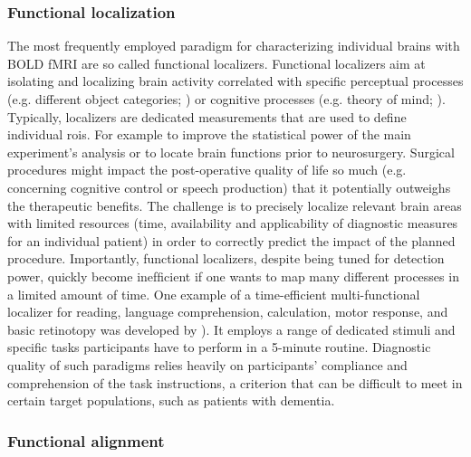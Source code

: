 \subsubsection{Functional localization}
%
The most frequently employed paradigm for characterizing individual brains with
BOLD fMRI are so called functional localizers.
%
Functional localizers aim at isolating and localizing brain activity correlated
with specific perceptual processes (e.g. different object categories;
\citep{kanwisher1997ffa}) or cognitive processes (e.g. theory of mind;
\citep{spunt2014validating}).
%
Typically, localizers are dedicated measurements that are used to define
individual \acp{roi}.
%
For example to improve the statistical power of the main experiment's analysis
or to locate brain functions prior to neurosurgery.
%
Surgical procedures might impact the post-operative quality of life so much
(e.g. concerning cognitive control or speech production) that it potentially
outweighs the therapeutic benefits.
%
The challenge is to precisely localize relevant brain areas with
limited resources (time, availability and applicability of diagnostic measures
for an individual patient) in order to correctly predict the impact of the
planned procedure.
%
Importantly, functional localizers, despite being tuned for detection power,
quickly become inefﬁcient if one wants to map many different processes in a
limited amount of time.
%
One example of a time-efficient multi-functional localizer for reading, language
comprehension, calculation, motor response, and basic retinotopy was developed
by \citep{pinel2007fast}).
%
It employs a range of dedicated stimuli and specific tasks participants have to
perform in a 5-minute routine.
%
Diagnostic quality of such paradigms relies heavily on participants' compliance
and comprehension of the task instructions, a criterion that can be difficult to
meet in certain target populations, such as patients with dementia.



\subsubsection{Functional alignment}

